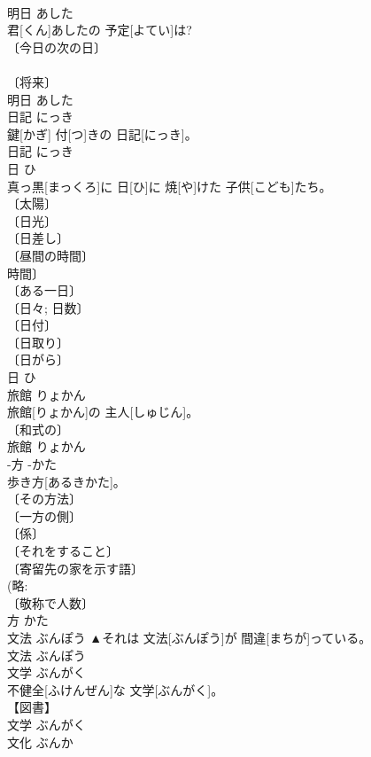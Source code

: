 \documentclass[8pt]{extreport}
\begin{document}
\begin{CJK}{UTF8}{min}
\\	明日	あした	
\\	君[くん]あしたの 予定[よてい]は?	
\\	〔今日の次の日〕 
\\	[＝あす] 
\\	〔将来〕 
\\	[＝あす]	明日	あした	
\\	日記	にっき	
\\	鍵[かぎ] 付[つ]きの 日記[にっき]。	
\\	日記	にっき	
\\	日	ひ	
\\	真っ黒[まっくろ]に 日[ひ]に 焼[や]けた 子供[こども]たち。	
\\	〔太陽〕 
\\	〔日光〕 
\\	〔日差し〕 
\\	〔昼間の時間〕 
\\	時間〕 
\\	〔ある一日〕 
\\	〔日々; 日数〕 
\\	〔日付〕 
\\	〔日取り〕 
\\	〔日がら〕 
\\	日	ひ	
\\	旅館	りょかん	
\\	旅館[りょかん]の 主人[しゅじん]。	
\\	〔和式の〕 
\\	旅館	りょかん	
\\	-方	-かた	
\\	歩き方[あるきかた]。	
\\	〔その方法〕 
\\	〔一方の側〕 
\\	〔係〕 
\\	〔それをすること〕 
\\	〔寄留先の家を示す語〕 
\\	(略: 
\\	〔敬称で人数〕 
\\	方	かた	
\\	文法	ぶんぽう	▲それは 文法[ぶんぽう]が 間違[まちが]っている。	
\\	文法	ぶんぽう	
\\	文学	ぶんがく	
\\	不健全[ふけんぜん]な 文学[ぶんがく]。	
\\	【図書】 
\\	文学	ぶんがく	
\\	文化	ぶんか	

\end{CJK}
\end{document}
